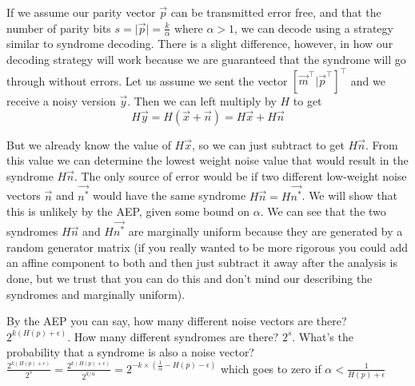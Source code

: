 \documentclass[11pt]{article}
\begin{document}
\begin{enumerate}
\begin{enumerate}
        If we assume our parity vector $\vec{p}$ can be transmitted error free, and that the number of parity bits $s = \vert \vec{p} \vert = \frac{k}{\alpha}$ where $\alpha > 1$, we can decode using a strategy similar to syndrome decoding.  There is a slight difference, however, in how our decoding strategy will work because we are guaranteed that the syndrome will go through without errors. Let us assume we sent the vector $[ \vec{m}^\top \vert \vec{p}^\top]^\top$ and we receive a noisy version $\vec{y}$. Then we can left multiply by $H$ to get
        \begin{equation*}
        H\vec{y} = H(\vec{x} + \vec{n}) = H\vec{x} + H\vec{n}
        \end{equation*}

        But we already know the value of $H\vec{x}$, so we can just subtract to get $H\vec{n}$. From this value we can determine the lowest weight noise value that would result in the syndrome $H\vec{n}$. The only source of error would be if two different low-weight noise vectors $\vec{n}$ and $\vec{n^*}$ would have the same syndrome $H\vec{n} = H\vec{n^*}$. We will show that this is unlikely by the AEP, given some bound on $\alpha$. We can see that the two syndromes $H\vec{n}$ and $H\vec{n^*}$ are marginally uniform because they are generated by a random generator matrix (if you really wanted to be more rigorous you could add an affine component to both and then just subtract it away after the analysis is done, but we trust that you can do this and don't mind our describing the syndromes and marginally uniform).

        By the AEP you can say, how many different noise vectors are there? $2^{k(H(p) + \epsilon)}$. How many different syndromes are there? $2^s$. What's the probability that a syndrome is also a noise vector? $\frac{2^{k(H(p) + \epsilon)}}{2^s} = \frac{2^{k(H(p) + \epsilon)}}{2^{k/\alpha}} = 2^{-k\times(\frac{1}{\alpha} - H(p) - \epsilon)}$ which goes to zero if $\alpha < \frac{1}{H(p) + \epsilon}$



\end{enumerate}
\end{enumerate}
\end{document}
